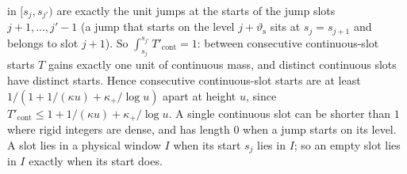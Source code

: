 in $[s_j,s_{j'})$ are exactly the unit jumps at the starts of the jump slots $j+1,\dots,j'-1$ (a jump that starts on the level
$j+\vartheta_{\mathrm s}$ sits at $s_j=s_{j+1}$ and belongs to slot $j+1$). So $\int_{s_j}^{s_{j'}}T'_{\mathrm{cont}}=1$: between
consecutive continuous-slot starts $T$ gains exactly one unit of continuous mass, and distinct continuous slots have distinct starts. Hence consecutive
continuous-slot starts are at least $1/(1+1/(\kappa u)+\kappa_+/\log u)$ apart at height $u$, since
$T'_{\mathrm{cont}}\le1+1/(\kappa u)+\kappa_+/\log u$. A single continuous slot can be shorter than $1$ where rigid integers are dense,
and has length $0$ when a jump starts on its level. A slot lies in a physical window $I$ when its start $s_j$ lies in $I$; so an
empty slot lies in $I$ exactly when its start does.

